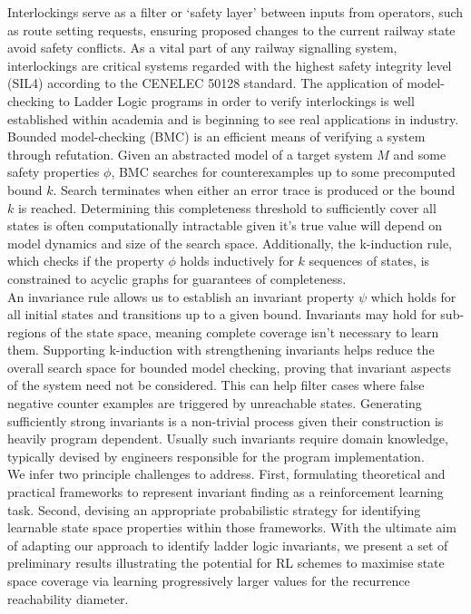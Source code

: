 \documentclass[runningheads]{llncs}
\begin{document}
Interlockings serve as a filter or ‘safety layer’ between inputs from operators, such as route setting requests, ensuring proposed changes to the current railway state avoid safety conflicts. As a vital part of any railway signalling system, interlockings are critical systems regarded with the highest safety integrity level
(SIL4) according to the CENELEC 50128 standard. The application of model-checking
to Ladder Logic programs in order to verify interlockings is well established within academia and is beginning to see real applications in industry.
Bounded model-checking (BMC) is an efficient means of verifying a system through refutation. Given an abstracted model of a target system $M$ and some safety properties $\phi$, BMC searches for counterexamples up to some precomputed bound $k$. Search terminates when either an error trace is produced or the bound $k$ is reached. Determining this completeness threshold to sufficiently cover all states is often computationally intractable given it's true value will depend on model dynamics and size of the search space. Additionally, the k-induction rule, which checks if the property $\phi$ holds inductively for $k$ sequences of states, is constrained to acyclic graphs for guarantees of completeness. \\

An invariance rule allows us to establish an invariant property $\psi$ which holds for all initial states and transitions up to a given bound. Invariants may hold for sub-regions of the state space, meaning complete coverage isn't necessary to learn them. Supporting k-induction with strengthening invariants helps reduce the overall search space for bounded model checking, proving that invariant aspects of the system need not be considered. This can help filter cases where false negative counter examples are triggered by unreachable states. Generating sufficiently strong invariants is a non-trivial process given their construction is heavily program dependent. Usually such invariants require domain knowledge, typically devised by engineers responsible for the program implementation. \\

We infer two principle challenges to address. First, formulating theoretical and practical frameworks to represent invariant finding as a reinforcement learning task. Second, devising an appropriate probabilistic strategy for identifying learnable state space properties within those frameworks. With the ultimate aim of adapting our approach to identify ladder logic invariants, we present a set of preliminary results illustrating the potential for RL schemes to maximise state space coverage via learning progressively larger values for the recurrence reachability diameter.
\end{document}
